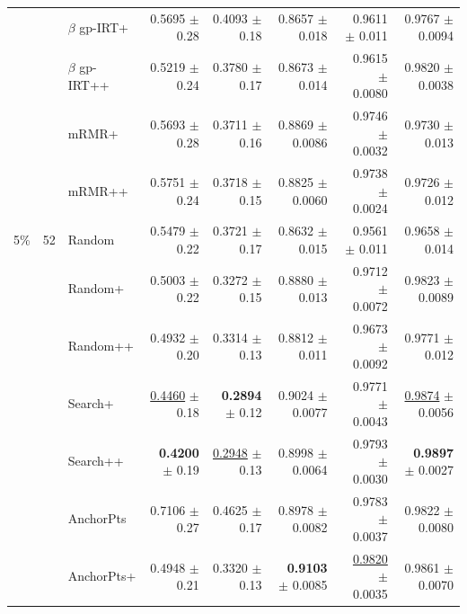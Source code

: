 \begin{longtable}{llp{}rrrrr}
 &  & $\beta$ gp-IRT+ & 0.5695 {\scriptsize $\pm$ 0.28} & 0.4093 {\scriptsize $\pm$ 0.18} & 0.8657 {\scriptsize $\pm$ 0.018} & 0.9611 {\scriptsize $\pm$ 0.011} & 0.9767 {\scriptsize $\pm$ 0.0094} \\
 &  & $\beta$ gp-IRT++ & 0.5219 {\scriptsize $\pm$ 0.24} & 0.3780 {\scriptsize $\pm$ 0.17} & 0.8673 {\scriptsize $\pm$ 0.014} & 0.9615 {\scriptsize $\pm$ 0.0080} & 0.9820 {\scriptsize $\pm$ 0.0038} \\
 &  & mRMR+ & 0.5693 {\scriptsize $\pm$ 0.28} & 0.3711 {\scriptsize $\pm$ 0.16} & 0.8869 {\scriptsize $\pm$ 0.0086} & 0.9746 {\scriptsize $\pm$ 0.0032} & 0.9730 {\scriptsize $\pm$ 0.013} \\
 &  & mRMR++ & 0.5751 {\scriptsize $\pm$ 0.24} & 0.3718 {\scriptsize $\pm$ 0.15} & 0.8825 {\scriptsize $\pm$ 0.0060} & 0.9738 {\scriptsize $\pm$ 0.0024} & 0.9726 {\scriptsize $\pm$ 0.012} \\
\midrule
5\% & 52 & Random & 0.5479 {\scriptsize $\pm$ 0.22} & 0.3721 {\scriptsize $\pm$ 0.17} & 0.8632 {\scriptsize $\pm$ 0.015} & 0.9561 {\scriptsize $\pm$ 0.011} & 0.9658 {\scriptsize $\pm$ 0.014} \\
 &  & Random+ & 0.5003 {\scriptsize $\pm$ 0.22} & 0.3272 {\scriptsize $\pm$ 0.15} & 0.8880 {\scriptsize $\pm$ 0.013} & 0.9712 {\scriptsize $\pm$ 0.0072} & 0.9823 {\scriptsize $\pm$ 0.0089} \\
 &  & Random++ & 0.4932 {\scriptsize $\pm$ 0.20} & 0.3314 {\scriptsize $\pm$ 0.13} & 0.8812 {\scriptsize $\pm$ 0.011} & 0.9673 {\scriptsize $\pm$ 0.0092} & 0.9771 {\scriptsize $\pm$ 0.012} \\
 &  & Search+ & \underline{0.4460} {\scriptsize $\pm$ 0.18} & \textbf{0.2894} {\scriptsize $\pm$ 0.12} & 0.9024 {\scriptsize $\pm$ 0.0077} & 0.9771 {\scriptsize $\pm$ 0.0043} & \underline{0.9874} {\scriptsize $\pm$ 0.0056} \\
 &  & Search++ & \textbf{0.4200} {\scriptsize $\pm$ 0.19} & \underline{0.2948} {\scriptsize $\pm$ 0.13} & 0.8998 {\scriptsize $\pm$ 0.0064} & 0.9793 {\scriptsize $\pm$ 0.0030} & \textbf{0.9897} {\scriptsize $\pm$ 0.0027} \\
 &  & AnchorPts & 0.7106 {\scriptsize $\pm$ 0.27} & 0.4625 {\scriptsize $\pm$ 0.17} & 0.8978 {\scriptsize $\pm$ 0.0082} & 0.9783 {\scriptsize $\pm$ 0.0037} & 0.9822 {\scriptsize $\pm$ 0.0080} \\
 &  & AnchorPts+ & 0.4948 {\scriptsize $\pm$ 0.21} & 0.3320 {\scriptsize $\pm$ 0.13} & \textbf{0.9103} {\scriptsize $\pm$ 0.0085} & \underline{0.9820} {\scriptsize $\pm$ 0.0035} & 0.9861 {\scriptsize $\pm$ 0.0070} \\

\end{longtable}
